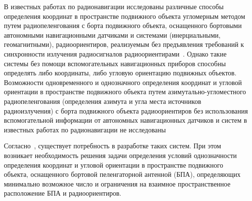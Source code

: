 \documentclass[../main.tex]{subfiles}
\begin{document}
В известных работах по радионавигации исследованы различные способы определения координат в пространстве подвижного объекта угломерным методом путем радиопеленгования с борта подвижного объекта, оснащенного бортовыми автономными навигационными датчиками и системами (инерциальными, геомагнитными), радиоориентиров, реализуемым без предъявления требований к синхронности излучения радиосигналов радиоориентирами~\cite{BBELAVIN:1977}. Однако такие системы без помощи вспомогательных навигационных приборов способны определять либо координаты, либо угловую ориентацию подвижных объектов. Возможности одновременного и однозначного определения координат и угловой ориентации в пространстве подвижного объекта путем азимутально-угломестного радиопеленгования (определения азимута и угла места источников радиоизлучения) с борта подвижного объекта радиоориентиров без использования вспомогательной информации от автономных навигационных датчиков и систем в известных работах по радионавигации не исследованы~\cite{VINOGRADOV:2016}

Согласно~\cite{REPORT:2015}, существует потребность в разработке таких систем. При этом возникает необходимость решения задачи определения условий однозначности определения координат и угловой ориентации в пространстве подвижного объекта, оснащенного бортовой пеленгаторной антенной (БПА), определяющих минимально возможное число и ограничения на взаимное пространственное расположение БПА и радиоориентиров.
\end{document}

